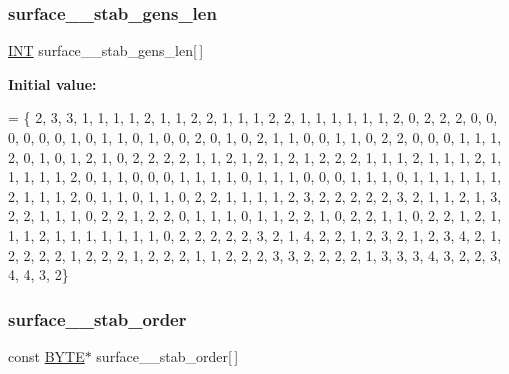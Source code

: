 \subsubsection{\texorpdfstring{surface\+\_\+\_\+stab\+\_\+gens\+\_\+len}{surface\_53\_stab\_gens\_len}}
{\footnotesize\ttfamily \mbox{\hyperlink{galois_8h_a09fddde158a3a20bd2dcadb609de11dc}{I\+NT}} surface\+\_\+\_\+stab\+\_\+gens\+\_\+len\mbox{[}$\,$\mbox{]}}

{\bfseries Initial value\+:}
\begin{DoxyCode}
= \{ 2, 3, 3, 1, 1, 1, 1, 2, 1, 1, 
    2, 2, 1, 1, 1, 2, 2, 1, 1, 1, 
    1, 1, 1, 2, 0, 2, 2, 2, 0, 0, 
    0, 0, 0, 0, 1, 0, 1, 1, 0, 1, 
    0, 0, 2, 0, 1, 0, 2, 1, 1, 0, 
    0, 1, 1, 0, 2, 2, 0, 0, 0, 1, 
    1, 1, 2, 0, 1, 0, 1, 2, 1, 0, 
    2, 2, 2, 2, 1, 1, 2, 1, 2, 1, 
    2, 1, 2, 2, 2, 1, 1, 1, 2, 1, 
    1, 1, 2, 1, 1, 1, 1, 1, 2, 0, 
    1, 1, 0, 0, 0, 1, 1, 1, 1, 0, 
    1, 1, 1, 0, 0, 0, 1, 1, 1, 0, 
    1, 1, 1, 1, 1, 1, 2, 1, 1, 1, 
    2, 0, 1, 1, 0, 1, 1, 0, 2, 2, 
    1, 1, 1, 1, 2, 3, 2, 2, 2, 2, 
    2, 3, 2, 1, 1, 2, 1, 3, 2, 2, 
    1, 1, 1, 0, 2, 2, 1, 2, 2, 0, 
    1, 1, 1, 0, 1, 1, 2, 2, 1, 0, 
    2, 2, 1, 1, 0, 2, 2, 1, 2, 1, 
    1, 1, 2, 1, 1, 1, 1, 1, 1, 1, 
    0, 2, 2, 2, 2, 2, 3, 2, 1, 4, 
    2, 2, 1, 2, 3, 2, 1, 2, 3, 4, 
    2, 1, 2, 2, 2, 2, 1, 2, 2, 2, 
    1, 2, 2, 2, 1, 1, 2, 2, 2, 3, 
    3, 2, 2, 2, 2, 1, 3, 3, 3, 4, 
    3, 2, 2, 3, 4, 4, 3, 2\}
\end{DoxyCode}
\mbox{\label{surface__53_8_c_a234a28ff0fb22172bdb999751bc148d7}} 
\subsubsection{\texorpdfstring{surface\+\_\+\_\+stab\+\_\+order}{surface\_53\_stab\_order}}
{\footnotesize\ttfamily const \mbox{\hyperlink{galois_8h_ab6cc7b4aeb6ea31aba2b3fbfc83ff5e6}{B\+Y\+TE}}$\ast$ surface\+\_\+\_\+stab\+\_\+order\mbox{[}$\,$\mbox{]}}

